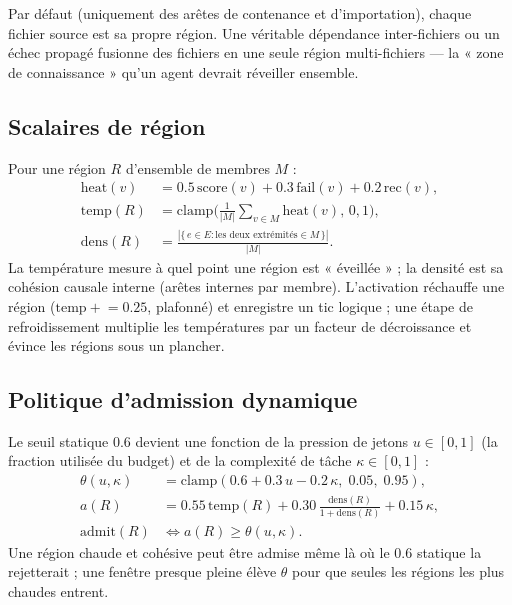 \documentclass[11pt]{article}
\begin{document}
Par défaut (uniquement des arêtes de contenance et d'importation), chaque fichier
source est sa propre région. Une véritable dépendance inter-fichiers ou un échec
propagé fusionne des fichiers en une seule région multi-fichiers --- la « zone de
connaissance » qu'un agent devrait réveiller ensemble.

\subsection{Scalaires de région}

Pour une région $R$ d'ensemble de membres $M$ :
\begin{align}
\mathrm{heat}(v)        &= 0.5\,\mathrm{score}(v) + 0.3\,\mathrm{fail}(v) + 0.2\,\mathrm{rec}(v), \\
\mathrm{temp}(R)        &= \mathrm{clamp}\!\Big(\tfrac{1}{|M|}\textstyle\sum_{v\in M}\mathrm{heat}(v),\,0,1\Big), \label{eq:temp}\\
\mathrm{dens}(R)        &= \frac{|\{\,e\in E : \text{les deux extrémités} \in M\,\}|}{|M|}. \label{eq:dens}
\end{align}
La température mesure à quel point une région est « éveillée » ; la densité est sa
cohésion causale interne (arêtes internes par membre). L'activation réchauffe une
région ($\mathrm{temp}\mathrel{+}=0.25$, plafonné) et enregistre un tic logique ; une
étape de refroidissement multiplie les températures par un facteur de décroissance et
évince les régions sous un plancher.

\subsection{Politique d'admission dynamique}\label{sec:policy}

Le seuil statique $0.6$ devient une fonction de la pression de jetons $u\in[0,1]$ (la
fraction utilisée du budget) et de la complexité de tâche $\kappa\in[0,1]$ :
\begin{align}
\theta(u,\kappa)       &= \mathrm{clamp}(0.6 + 0.3\,u - 0.2\,\kappa,\; 0.05,\; 0.95), \\
a(R)                   &= 0.55\,\mathrm{temp}(R) + 0.30\,\frac{\mathrm{dens}(R)}{1+\mathrm{dens}(R)} + 0.15\,\kappa, \\
\mathrm{admit}(R)      &\iff a(R) \ge \theta(u,\kappa).
\end{align}
Une région chaude et cohésive peut être admise même là où le $0.6$ statique la
rejetterait ; une fenêtre presque pleine élève $\theta$ pour que seules les régions
les plus chaudes entrent.
\end{document}
